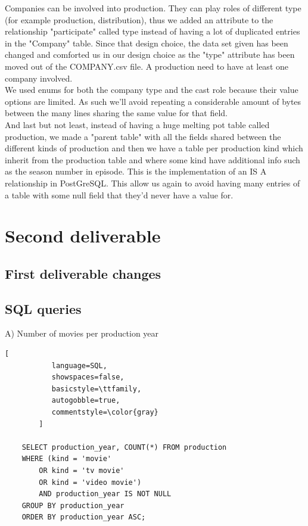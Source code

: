 \documentclass{article}
\begin{document}
    Companies can be involved into production. They can play roles of different type (for example production, distribution), thus we added an attribute to the relationship "participate" called type instead of having a lot of duplicated entries in the "Company" table. Since that design choice, the data set given has been changed and comforted us in our design choice as the "type" attribute has been moved out of the COMPANY.csv file. A production need to have at least one company involved.\\
    
    We used enums for both the company type and the cast role because their value options are limited. As such we'll avoid repeating a considerable amount of bytes between the many lines sharing the same value for that field.\\
    
    And last but not least, instead of having a huge melting pot table called production, we made a "parent table" with all the fields shared between the different kinds of production and then we have a table per production kind which inherit from the production table and where some kind have additional info such as the season number in episode. This is the implementation of an IS A relationship in PostGreSQL. This allow us again to avoid having many entries of a table with some null field that they'd never have a value for.

\pagebreak
\section{Second deliverable}

\subsection{First deliverable changes}


\subsection{SQL queries}

A) Number of movies per production year
    \begin{lstlisting}[
           language=SQL,
           showspaces=false,
           basicstyle=\ttfamily,
           autogobble=true,
           commentstyle=\color{gray}
        ]
        
    SELECT production_year, COUNT(*) FROM production
    WHERE (kind = 'movie'
        OR kind = 'tv movie'
        OR kind = 'video movie')
        AND production_year IS NOT NULL
    GROUP BY production_year
    ORDER BY production_year ASC;
    \end{lstlisting}
\medskip
\end{document}

